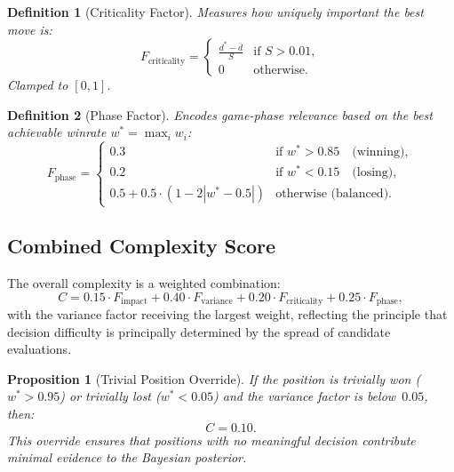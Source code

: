 \documentclass[11pt,a4paper]{article}
\newtheorem{definition}{Definition}
\newtheorem{proposition}{Proposition}
\begin{document}
\begin{definition}[Criticality Factor]
\label{def:criticality}
Measures how uniquely important the best move is:
\begin{equation}
    F_{\text{criticality}} = \begin{cases}
        \displaystyle\frac{d^* - \bar{d}}{S} & \text{if } S > 0.01, \\[6pt]
        0 & \text{otherwise}.
    \end{cases}
    \label{eq:criticality}
\end{equation}
Clamped to $[0, 1]$.
\end{definition}

\begin{definition}[Phase Factor]
\label{def:phase}
Encodes game-phase relevance based on the best achievable winrate
$w^* = \max_i w_i$:
\begin{equation}
    F_{\text{phase}} = \begin{cases}
        0.3 & \text{if } w^* > 0.85 \quad\text{(winning)}, \\
        0.2 & \text{if } w^* < 0.15 \quad\text{(losing)}, \\
        0.5 + 0.5 \cdot (1 - 2|w^* - 0.5|) & \text{otherwise (balanced)}.
    \end{cases}
    \label{eq:phase}
\end{equation}
\end{definition}

\subsection{Combined Complexity Score}

The overall complexity is a weighted combination:
\begin{equation}
    C = 0.15 \cdot F_{\text{impact}} + 0.40 \cdot F_{\text{variance}}
    + 0.20 \cdot F_{\text{criticality}} + 0.25 \cdot F_{\text{phase}},
    \label{eq:complexity}
\end{equation}
with the variance factor receiving the largest weight, reflecting the principle
that decision difficulty is principally determined by the spread of candidate
evaluations.

\begin{proposition}[Trivial Position Override]
\label{prop:trivial}
If the position is trivially won ($w^* > 0.95$) or trivially lost
($w^* < 0.05$) and the variance factor is below~$0.05$, then:
\begin{equation}
    C = 0.10.
    \label{eq:trivial}
\end{equation}
This override ensures that positions with no meaningful decision contribute
minimal evidence to the Bayesian posterior.
\end{proposition}
\end{document}
